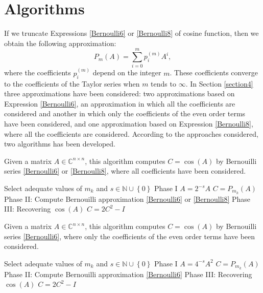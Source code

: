 \section{Algorithms} \label{section3}
If we truncate Expressions \eqref{Bernoulli6} or \eqref{Bernoulli8} of cosine function, then we obtain the following approximation:
\begin{equation}
\label{Pm}
{P_m}(A) = \sum\limits_{i = 0}^m {{p_i^{(m)}}{A^i}},
\end{equation}where the coefficients ${p_i^{(m)}}$ depend on  
 the integer $m$.  These coefficients  converge to the coefficients of the Taylor series when $m$ tends to $\infty$. In Section \ref{section4} three approximations have been considered: two approximations based on Expression  \eqref{Bernoulli6}, an approximation in which all the coefficients are considered and another in which only the coefficients of the even order terms have been considered, and one approximation based on Expression \eqref{Bernoulli8}, where all the coefficients are considered. According to the approaches considered,  two algorithms  has been developed.

\begin{algorithm}[!ht]
\caption{Given a matrix $A \in {\mathbb{C}^{n \times n}}$, this algorithm computes $C=\cos(A)$ by Bernouilli series \eqref{Bernoulli6} or \eqref{Bernoulli8}, where all coefficients have been considered.}
\label{Alg_cos1}
\begin{algorithmic} [1]
\State Select adequate values of $m_k$ and $s \in \mathbb{N} \cup \left\{ 0 \right\}$ \Comment Phase I
\State $A=2^{-s}A$
\State $C=P_{m_k}(A)$ \Comment Phase II: Compute Bernouilli approximation \eqref{Bernoulli6} or \eqref{Bernoulli8} 
  \Comment Phase III: Recovering $\cos(A)$
    \State $C=2C^{2}-I$
 \EndFor
\end{algorithmic}
\end{algorithm}

\begin{algorithm}[!ht]
\caption{Given a matrix $A \in {\mathbb{C}^{n \times n}}$, this algorithm computes $C=\cos(A)$ by Bernouilli series \eqref{Bernoulli6}, where only the coefficients of the even order terms have been considered.}
\label{Alg_cos2}
\begin{algorithmic} [1]
\State Select adequate values of $m_k$ and $s \in \mathbb{N} \cup \left\{ 0 \right\}$ \Comment Phase I
\State $A=4^{-s}A^2$
\State $C=P_{m_k}(A)$ \Comment Phase II: Compute Bernouilli approximation \eqref{Bernoulli6}
  \Comment Phase III: Recovering $\cos(A)$
    \State $C=2C^{2}-I$
 \EndFor
\end{algorithmic}
\end{algorithm}

